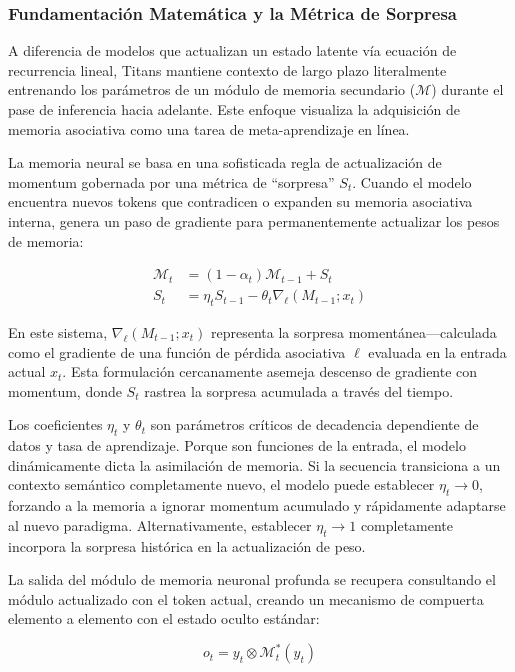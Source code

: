 \documentclass[11pt,a4paper]{article}
\begin{document}
\subsubsection{Fundamentación Matemática y la Métrica de Sorpresa}

A diferencia de modelos que actualizan un estado latente vía ecuación de recurrencia lineal, Titans mantiene contexto de largo plazo literalmente entrenando los parámetros de un módulo de memoria secundario ($\mathcal{M}$) durante el pase de inferencia hacia adelante. Este enfoque visualiza la adquisición de memoria asociativa como una tarea de meta-aprendizaje en línea.

La memoria neural se basa en una sofisticada regla de actualización de momentum gobernada por una métrica de ``sorpresa'' $S_t$. Cuando el modelo encuentra nuevos tokens que contradicen o expanden su memoria asociativa interna, genera un paso de gradiente para permanentemente actualizar los pesos de memoria:

$$
\begin{aligned}
\mathcal{M}_t &= (1 - \alpha_t)\mathcal{M}_{t-1} + S_t \\
S_t &= \eta_t S_{t-1} - \theta_t \nabla_\ell(M_{t-1}; x_t)
\end{aligned}
$$

En este sistema, $\nabla_\ell(M_{t-1}; x_t)$ representa la sorpresa momentánea---calculada como el gradiente de una función de pérdida asociativa $\ell$ evaluada en la entrada actual $x_t$. Esta formulación cercanamente asemeja descenso de gradiente con momentum, donde $S_t$ rastrea la sorpresa acumulada a través del tiempo.

Los coeficientes $\eta_t$ y $\theta_t$ son parámetros críticos de decadencia dependiente de datos y tasa de aprendizaje. Porque son funciones de la entrada, el modelo dinámicamente dicta la asimilación de memoria. Si la secuencia transiciona a un contexto semántico completamente nuevo, el modelo puede establecer $\eta_t \to 0$, forzando a la memoria a ignorar momentum acumulado y rápidamente adaptarse al nuevo paradigma. Alternativamente, establecer $\eta_t \to 1$ completamente incorpora la sorpresa histórica en la actualización de peso.

La salida del módulo de memoria neuronal profunda se recupera consultando el módulo actualizado con el token actual, creando un mecanismo de compuerta elemento a elemento con el estado oculto estándar:

$$
o_t = y_t \otimes \mathcal{M}_t^*(y_t)
$$
\end{document}
